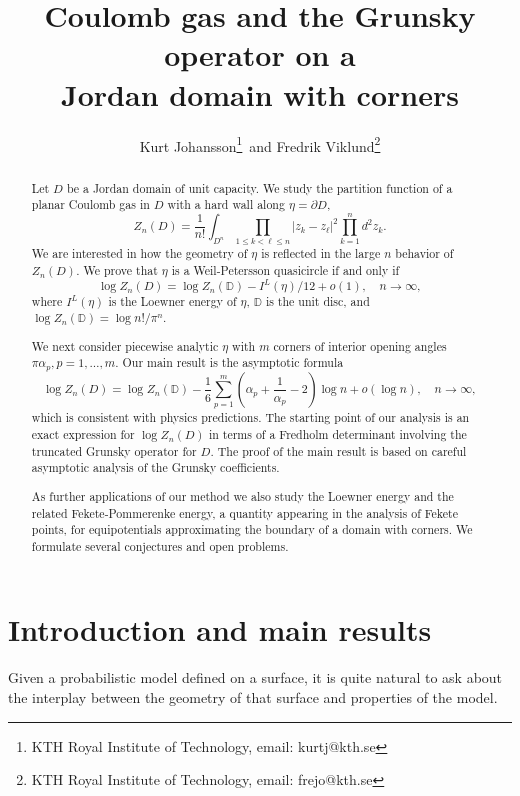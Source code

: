 \documentclass{article}
\title{Coulomb gas and the Grunsky operator on a\\ Jordan domain with corners}
\author{Kurt Johansson\thanks{KTH Royal Institute of Technology, email:  kurtj@kth.se}\,  and Fredrik Viklund\thanks{KTH Royal Institute of Technology, email:  frejo@kth.se}}
\date{}
\numberwithin{equation}{section}
\numberwithin{figure}{section}
\theoremstyle{plain}
\theoremstyle{plain}
\numberwithin{thm}{section}
\theoremstyle{remark}
\newcommand{\D}{\mathbb{D}}
\let \le \leqslant
\begin{document}
\maketitle

\begin{abstract}
Let $D$ be a Jordan domain of unit capacity. We study the partition function of a planar Coulomb gas in $D$ with a hard wall along $\eta = \partial D$,
\[Z_{n}(D) =\frac 1{n!}\int_{D^n}\prod_{1\le k < \ell \le  n}|z_k-z_\ell|^{2} \prod_{k=1}^n d^2z_k.\]
We are interested in how the geometry of $\eta$ is reflected in the large $n$ behavior of $Z_n(D)$. We prove that $\eta$ is a Weil-Petersson quasicircle if and only if
 \[
 \log Z_n(D)= \log Z_n(\D)  -I^L(\eta)/12 + o(1), \quad n\to \infty,
 \]
 where $I^L(\eta)$ is the Loewner energy of $\eta$, $\D$ is the unit disc, and $\log Z_n(\D)  = \log  n!/\pi^n$. 
 
 We next consider piecewise analytic $\eta$ with $m$ corners of interior opening angles $\pi \alpha_p, p=1,\ldots, m$. Our main result is the asymptotic formula
 \[
 \log  Z_n(D)= \log Z_n(\D) - \frac 16\sum_{p=1}^m \left(\alpha_p+\frac 1{\alpha_p}-2 \right) \log n  + o(\log n),  \quad n\to \infty,
 \]
which is consistent with physics predictions.
   The starting point of our analysis is an exact expression for $\log Z_{n}(D)$ in terms of a Fredholm determinant involving the truncated Grunsky operator for $D$. The proof of the main result is based on careful asymptotic analysis of the Grunsky coefficients.  

   As further applications of our method we also study the Loewner energy and the related Fekete-Pommerenke energy, a quantity appearing in the analysis of Fekete points, for equipotentials approximating the boundary of a domain with corners. We formulate several conjectures and open problems.
\end{abstract}

\section{Introduction and main results}\label{sec:intro}
Given a probabilistic model defined on a surface, it is quite natural to ask about the interplay between the geometry of that surface and properties of the model.  
\end{document}
